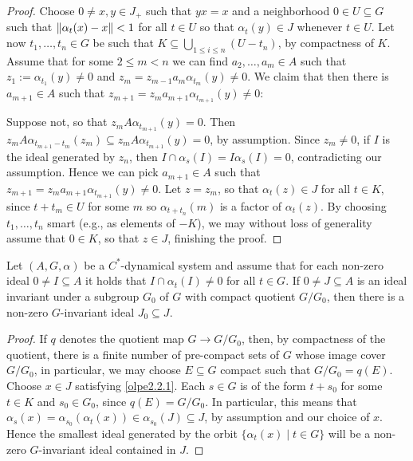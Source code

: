 \begin{proof}
	Choose $0 \neq x,y \in J_+$ such that $yx=x$ and a neighborhood $0 \in U \subseteq G$ such that $\left\lVert \alpha_t(x)-x\right\rVert < 1$ for all $t \in U$ so that $\alpha_t(y) \in J$ whenever $ t \in U$. Let now $t_1,\dots,t_n \in G$ be such that $K \subseteq \bigcup_{1 \leq i \leq n} (U-t_n)$, by compactness of $K$. Assume that for some $2 \leq m < n$ we can find $a_2,\dots,a_m \in A$ such that $z_1:= \alpha_{t_1}(y) \neq 0$ and $z_m = z_{m-1} a_m \alpha_{t_m}(y) \neq 0$. We claim that then there is $a_{m+1} \in A$ such that $z_{m+1}=z_{m}a_{m+1}\alpha_{t_{m+1}}(y) \neq 0$:

	Suppose not, so that $z_m A \alpha_{t_{m+1}}(y) = 0$. Then $z_m A \alpha_{t_{m+1}-t_m}(z_m) \subseteq  z_m A \alpha_{t_{m+1}}(y)=0$, by assumption. Since $z_m \neq 0$, if $I$ is the ideal generated by $z_n$, then $I \cap \alpha_{s}(I) = I \alpha_{s}(I)= 0$, contradicting our assumption. Hence we can pick $a_{m+1} \in A$ such that $z_{m+1} = z_m a_{m+1} \alpha_{t_{m+1}}(y) \neq 0$. Let $z = z_m$, so that $\alpha_t(z) \in J$ for all $t \in K$, since $t +t_m \in U$ for some $m$ so $\alpha_{t+t_{n}}(m)$ is a factor of $\alpha_t(z)$. By choosing $t_1,\dots,t_n$ smart (e.g., as elements of $-K$), we may without loss of generality assume that $0 \in K$, so that $z \in J$, finishing the proof.
\end{proof}
\begin{proposition}
Let $(A,G,\alpha)$ be a $C^*$-dynamical system and assume that for each non-zero ideal $0 \neq I \subseteq A$ it holds that $I \cap \alpha_t(I) \neq 0 $ for all $t \in G$. If $0 \neq J \subseteq A$ is an ideal invariant under a subgroup $G_0$ of $G$ with compact quotient $G/G_0$, then there is a non-zero $G$-invariant ideal $J_0 \subseteq J$.
	\label{olpe2.2.2}
\end{proposition}
\begin{proof}
	If $q$ denotes the quotient map $G \to G/G_0$, then, by compactness of the quotient, there is a finite number of pre-compact sets of $G$ whose image cover $G/G_0$, in particular, we may choose $E \subseteq G$ compact such that $G/G_0 = q(E)$. Choose $x\in J$ satisfying \cref{olpe2.2.1}. Each $s \in G$ is of the form $t+s_0$ for some $t \in K$ and $s_0 \in G_0$, since $q(E) = G/G_0$. In particular, this means that $\alpha_s(x) = \alpha_{s_0}(\alpha_t(x)) \in \alpha_{s_0}(J) \subseteq J$, by assumption and our choice of $x$. Hence the smallest ideal generated by the orbit $\{ \alpha_t(x) \mid t \in G\}$ will be a non-zero $G$-invariant ideal contained in $J$.
\end{proof}
